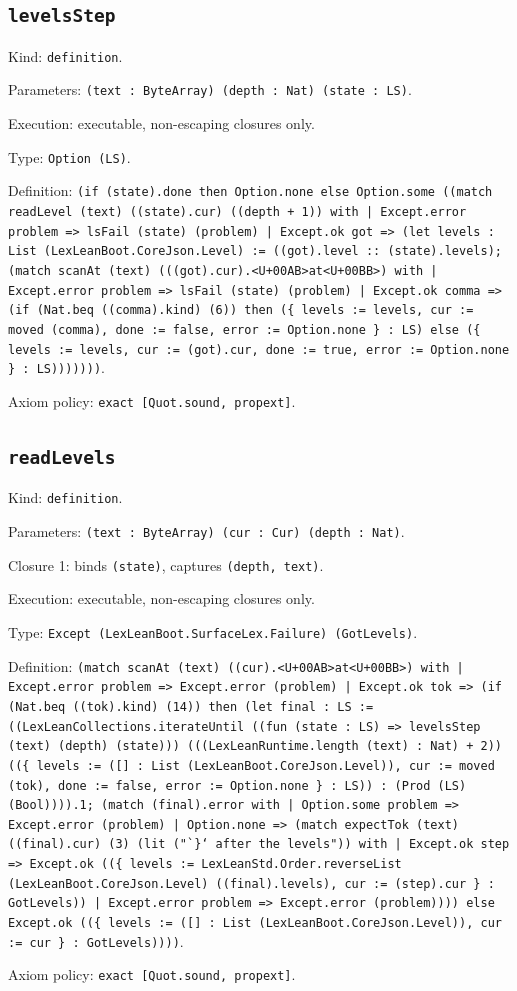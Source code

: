 \documentclass[11pt]{article}
\begin{document}
\subsection*{\texttt{levelsStep}}
\noindent Kind: \texttt{definition}.\par
\noindent Parameters: \texttt{(text : ByteArray) (depth : Nat) (state : LS)}.\par
\noindent Execution: executable, non-escaping closures only.\par
\noindent Type: \texttt{Option (LS)}.\par
\noindent Definition: \texttt{(if (state).done then Option.none else Option.some ((match readLevel (text) ((state).cur) ((depth + 1)) with | Except.error problem => lsFail (state) (problem) | Except.ok got => (let levels : List (LexLeanBoot.CoreJson.Level) := ((got).level :: (state).levels); (match scanAt (text) (((got).cur).<U+00AB>at<U+00BB>) with | Except.error problem => lsFail (state) (problem) | Except.ok comma => (if (Nat.beq ((comma).kind) (6)) then (\{ levels := levels, cur := moved (comma), done := false, error := Option.none \} : LS) else (\{ levels := levels, cur := (got).cur, done := true, error := Option.none \} : LS)))))))}.\par
\noindent Axiom policy: \texttt{exact [Quot.sound, propext]}.\par
\subsection*{\texttt{readLevels}}
\noindent Kind: \texttt{definition}.\par
\noindent Parameters: \texttt{(text : ByteArray) (cur : Cur) (depth : Nat)}.\par
\noindent Closure 1: binds \texttt{(state)}, captures \texttt{(depth, text)}.\par
\noindent Execution: executable, non-escaping closures only.\par
\noindent Type: \texttt{Except (LexLeanBoot.SurfaceLex.Failure) (GotLevels)}.\par
\noindent Definition: \texttt{(match scanAt (text) ((cur).<U+00AB>at<U+00BB>) with | Except.error problem => Except.error (problem) | Except.ok tok => (if (Nat.beq ((tok).kind) (14)) then (let final : LS := ((LexLeanCollections.iterateUntil ((fun (state : LS) => levelsStep (text) (depth) (state))) (((LexLeanRuntime.length (text) : Nat) + 2)) ((\{ levels := ([] : List (LexLeanBoot.CoreJson.Level)), cur := moved (tok), done := false, error := Option.none \} : LS)) : (Prod (LS) (Bool)))).1; (match (final).error with | Option.some problem => Except.error (problem) | Option.none => (match expectTok (text) ((final).cur) (3) (lit ("`\}` after the levels")) with | Except.ok step => Except.ok ((\{ levels := LexLeanStd.Order.reverseList (LexLeanBoot.CoreJson.Level) ((final).levels), cur := (step).cur \} : GotLevels)) | Except.error problem => Except.error (problem)))) else Except.ok ((\{ levels := ([] : List (LexLeanBoot.CoreJson.Level)), cur := cur \} : GotLevels))))}.\par
\noindent Axiom policy: \texttt{exact [Quot.sound, propext]}.\par
\end{document}
